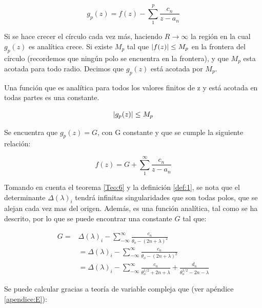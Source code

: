 \begin{equation}\label{eq:2.23}
    g_p(z)=f(z)-\sum^{p}_1 \frac{c_n}{z-a_n}
\end{equation}

Si se hace crecer el círculo cada vez más, haciendo $R \rightarrow \infty$ la región en la cual $g_p(z)$ es analítica crece. Si existe $M_p$ tal que $\abs{f(z)}\leq M_p$ en la frontera del círculo (recordemos que ningún polo se encuentra en la frontera), y que $M_p$ esta acotada para todo radio. Decimos que $g_p(z)$ está acotada por $M_p$.

\begin{teo}\label{Teo:6}
 Una función que es analítica para todos los valores finitos de z y está acotada en todas partes es una constante.\cite{Philip}
\end{teo}

\begin{equation}\label{eq:2.24}
  \abs{g_p(z)} \leq M_p  
\end{equation}


Se encuentra que $g_p(z)=G$, con G constante y que se cumple la siguiente relación:

\begin{equation}\label{eq:2.25}
    f(z)=G+\sum^{\infty}_1 \frac{c_n}{z-a_n}
\end{equation}

Tomando en cuenta el teorema \ref{Teo:6} y la definición \ref{def:1}, se nota que el determinante $\Delta(\lambda)_i$ tendrá infinitas singularidades que son todas polos, que se alejan cada vez mas del origen. Además, es una función analítica, tal como se ha descrito, por lo que se puede encontrar una constante $G$ tal que:
 
 \begin{equation}\label{eq:E.25}
 \begin{aligned}
 G=&\Delta(\lambda)_{i}-\sum^{\infty}_{-\infty} \frac{c_n}{\theta_o-(2n+\lambda)^2}\\
  &=\Delta(\lambda)_{i}-\sum^{\infty}_{-\infty} \frac{c_n}{\theta_o-(2n+\lambda)^2}\\
  &=\Delta(\lambda)_{i}-\sum^{\infty}_{-\infty} \frac{c_n}{\theta_o^{1/2}+2n+\lambda}+\frac{d_n}{\theta_o^{1/2}-2n-\lambda}
 \end{aligned}
 \end{equation}
 


Se puede calcular gracias a teoría de variable compleja que (ver apéndice \ref{apendice:E}):


